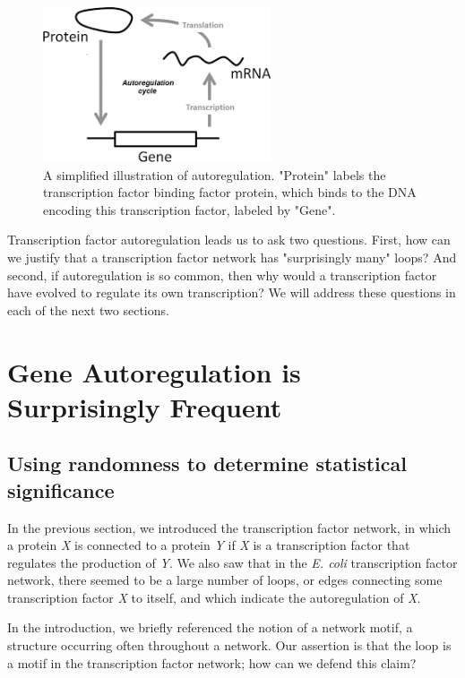 \begin{figure}[h]
\centering
\mySfFamily
\includegraphics[width = 0.6\textwidth]{../images/autoregulation_example.png}
\caption{A simplified illustration of autoregulation. "Protein" labels the transcription factor binding factor protein, which binds to the DNA encoding this transcription factor, labeled by "Gene".}
\label{fig:autoregulation_example}
\end{figure}

Transcription factor autoregulation leads us to ask two questions. First, how can we justify that a transcription factor network has "surprisingly many" loops? And second, if autoregulation is so common, then why would a transcription factor have evolved to regulate its own transcription? We will address these questions in each of the next two sections.


\FloatBarrier
{}

\section{Gene Autoregulation is Surprisingly Frequent}
\label{sec:gene_autoregulation_is_surprisingly_frequent}

\subsection{Using randomness to determine statistical significance}

In the previous section, we introduced the transcription factor network, in which a protein \textit{X} is connected to a protein \textit{Y} if \textit{X} is a transcription factor that regulates the production of \textit{Y}. We also saw that in the \textit{E. coli} transcription factor network, there seemed to be a large number of loops, or edges connecting some transcription factor \textit{X} to itself, and which indicate the autoregulation of \textit{X}.

In the introduction, we briefly referenced the notion of a network motif, a structure occurring often throughout a network. Our assertion is that the loop is a motif in the transcription factor network; how can we defend this claim?

